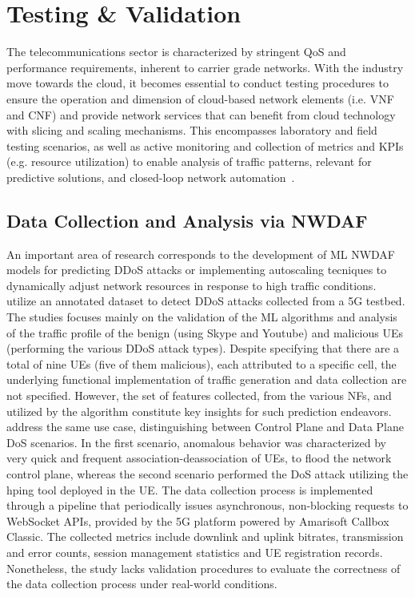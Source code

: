 \section{Testing \& Validation} \label{sec:testingandvalidation}

The telecommunications sector is characterized by stringent \acs{QoS} and performance requirements, inherent to carrier grade networks. With the industry move towards the cloud, it becomes essential to conduct testing procedures to ensure the operation and dimension of cloud-based network elements (i.e. \acs{VNF} and \acs{CNF}) and provide network services that can benefit from cloud technology with slicing and scaling mechanisms. This encompasses laboratory and field testing scenarios, as well as active monitoring and collection of metrics and \acsp{KPI} (e.g. resource utilization) to enable analysis of traffic patterns, relevant for predictive solutions, and closed-loop network automation~\cite{CapacityPerformanceTestMethodsCloudNF}.

\subsection{Data Collection and Analysis via NWDAF}

An important area of research corresponds to the development of \acs{ML} \acs{NWDAF} models for predicting \acs{DDoS} attacks or implementing autoscaling tecniques to dynamically adjust network resources in response to high traffic conditions. \citep{UserTerminalsAsAttackers, AdvancingPredictiveSecurity} utilize an annotated dataset to detect \acs{DDoS} attacks collected from a \acs{5G} testbed. The studies focuses mainly on the validation of the \acs{ML} algorithms and analysis of the traffic profile of the benign (using Skype and Youtube) and malicious \acsp{UE} (performing the various \acs{DDoS} attack types). Despite specifying that there are a total of nine \acsp{UE} (five of them malicious), each attributed to a specific cell, the underlying functional implementation of traffic generation and data collection are not specified. However, the set of features collected, from the various \acsp{NF}, and utilized by the algorithm constitute key insights for such prediction endeavors. \citet{PerformanceComparisonNWDAFSecurity} address the same use case, distinguishing between Control Plane and Data Plane \acs{DoS} scenarios. In the first scenario, anomalous behavior was characterized by very quick and frequent association-deassociation of \acsp{UE}, to flood the network control plane, whereas the second scenario performed the \acs{DoS} attack utilizing the hping tool deployed in the \acs{UE}. The data collection process is implemented through a pipeline that periodically issues asynchronous, non-blocking requests to WebSocket \acsp{API}, provided by the \acs{5G} platform powered by Amarisoft Callbox Classic. The collected metrics include downlink and uplink bitrates, transmission and error counts, session management statistics and \acs{UE} registration records. Nonetheless, the study lacks validation procedures to evaluate the correctness of the data collection process under real-world conditions.

